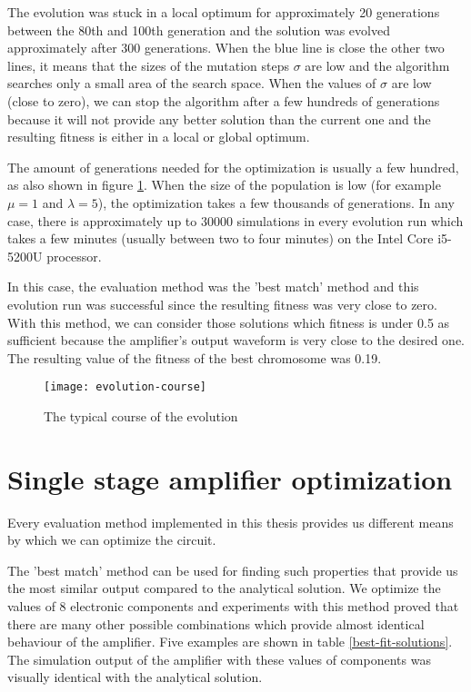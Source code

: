 The evolution was stuck in a local optimum for approximately 20 generations between the 80th and 100th generation and the solution was evolved approximately after 300 generations. When the blue line is close the other two lines, it means that the sizes of the mutation steps $\sigma$ are low and the algorithm searches only a small area of the search space. When the values of $\sigma$ are low (close to zero), we can stop the algorithm after a few hundreds of generations because it will not provide any better solution than the current one and the resulting fitness is either in a local or global optimum.

The amount of generations needed for the optimization is usually a few hundred, as also shown in figure \ref{evolution-course}. When the size of the population is low (for example $\mu = 1$ and $\lambda = 5$), the optimization takes a few thousands of generations. In any case, there is approximately up to 30000 simulations in every evolution run which takes a few minutes (usually between two to four minutes) on the Intel Core i5-5200U processor.

In this case, the evaluation method was the 'best match' method and this evolution run was successful since the resulting fitness was very close to zero. With this method, we can consider those solutions which fitness is under 0.5 as sufficient because the amplifier's output waveform is very close to the desired one. The resulting value of the fitness of the best chromosome was 0.19.

\begin{figure}[H]
    \centerline{\texttt{[image: evolution-course]}
    \label{evolution-course}}
    \caption{The typical course of the evolution}
\end{figure}

\section{Single stage amplifier optimization} \label{single-stage-results}
Every evaluation method implemented in this thesis provides us different means by which we can optimize the circuit.

The 'best match' method can be used for finding such properties that provide us the most similar output compared to the analytical solution. We optimize the values of 8 electronic components and experiments with this method proved that there are many other possible combinations which provide almost identical behaviour of the amplifier. Five examples are shown in table \ref{best-fit-solutions}. The simulation output of the amplifier with these values of components was visually identical with the analytical solution.



